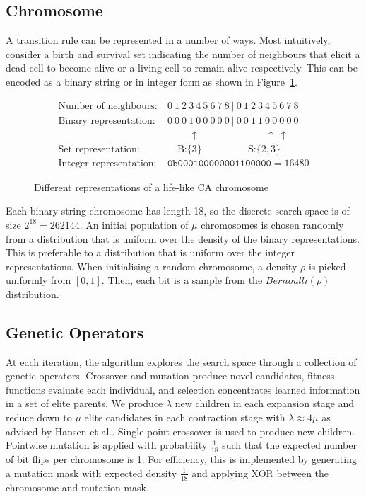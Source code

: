 \subsection{Chromosome}
A transition rule can be represented in a number of ways. Most intuitively, consider a birth and survival set indicating the number of neighbours that elicit a dead cell to become alive or a living cell to remain alive respectively. This can be encoded as a binary string or in integer form as shown in Figure~\ref{fig:bs-calc}.\\

\begin{figure}[!h] 
\begin{equation*} 
\begin{split}
    \text{Number of neighbours:}&\ 0\ 1\ 2\ 3\ 4\ 5\ 6\ 7\ 8\ |\ 0\ 1\ 2\ 3\ 4\ 5\ 6\ 7\ 8\\
    \text{Binary representation:}&\ 0\ 0\ 0\ 1\ 0\ 0\ 0\ 0\ 0\ |\ 0\ 0\ 1\ 1\ 0\ 0\ 0\ 0\ 0\\
    &\qquad\ \: \uparrow \qquad \qquad \qquad \ \: \: \uparrow \ \uparrow\\
    \text{Set representation:}&\quad \ \text{B:} \{3\} \qquad \qquad \ \ \: \text{S:}\{2, 3\}\\
    \text{Integer representation:}&\ \texttt{0b000100000001100000} = 16480
\end{split}   
\end{equation*}
\caption{Different representations of a life-like CA chromosome}
\label{fig:bs-calc}
\end{figure}

Each binary string chromosome has length 18, so the discrete search space is of size $2^{18} = 262144$. An initial population of $\mu$ chromosomes is chosen randomly from a distribution that is uniform over the density of the binary representations. This is preferable to a distribution that is uniform over the integer representations\cite{mitchell1994evolving}. When initialising a random chromosome, a density $\rho$ is picked uniformly from $[0, 1]$. Then, each bit is a sample from the $\mathit{Bernoulli}(\rho)$ distribution.

\subsection{Genetic Operators}
At each iteration, the algorithm explores the search space through a collection of genetic operators. Crossover and mutation produce novel candidates, fitness functions evaluate each individual, and selection concentrates learned information in a set of elite parents. We produce $\lambda$ new children in each expansion stage and reduce down to $\mu$ elite candidates in each contraction stage with $\lambda \approx 4\mu$ as advised by Hansen et al.\cite{hansen2015evolution}. Single-point crossover is used to produce new children. Pointwise mutation is applied with probability $\frac{1}{18}$ such that the expected number of bit flips per chromosome is 1. For efficiency, this is implemented by generating a mutation mask with expected density $\frac{1}{18}$ and applying XOR between the chromosome and mutation mask.\\

